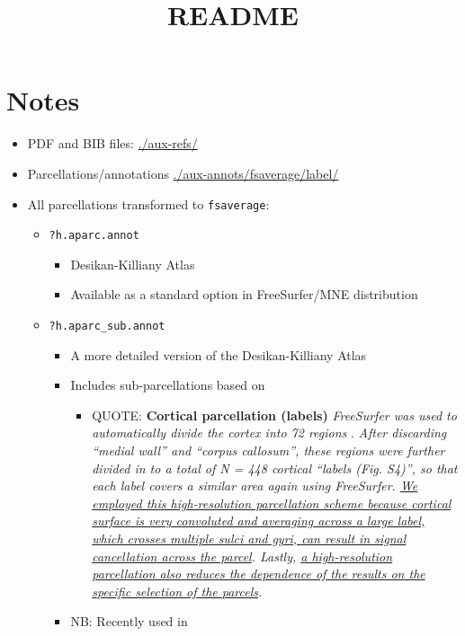 \documentclass[a4paper,10pt,onecolumn,oneside,openright]{article}
\date{}
\title{README}
\begin{document}
\maketitle
\section{Notes}
\label{sec:org0a92b78}
\begin{itemize}
\item PDF and BIB files: \url{./aux-refs/}
\item Parcellations/annotations \url{./aux-annots/fsaverage/label/}
\item All parcellations transformed to \texttt{fsaverage}:
\begin{itemize}
\item \texttt{?h.aparc.annot}
\begin{itemize}
\item Desikan-Killiany Atlas \parencite{r2006PaperDesikanEtAlN2}
\item Available as a standard option in FreeSurfer/MNE distribution
\end{itemize}
\item \texttt{?h.aparc\_sub.annot}
\begin{itemize}
\item A more detailed version of the Desikan-Killiany Atlas
\parencite{r2006PaperDesikanEtAlN2}
\item Includes sub-parcellations based on
\textcite{r2018PaperKhanEtAlN2}
\begin{itemize}
\item QUOTE: \textbf{Cortical parcellation (labels)} \emph{FreeSurfer was
used to automatically divide the cortex into 72 regions}
\parencite{r1999PaperDaleEtAlN2}. \emph{After discarding “medial
wall” and “corpus callosum”, these regions were further
divided in to a total of N = 448 cortical “labels (Fig.
S4)”, so that each label covers a similar area again using
FreeSurfer. \uline{We employed this high-resolution parcellation
scheme because cortical surface is very convoluted and
averaging across a large label, which crosses multiple
sulci and gyri, can result in signal cancellation across
the parcel}. Lastly, \uline{a high-resolution parcellation also
reduces the dependence of the results on the specific
selection of the parcels}.}
\end{itemize}
\item NB: Recently used in \textcite{r2025PaperRuuskanenAvendano-DiazN1}
\begin{itemize}

\end{itemize}
\end{itemize}
\end{itemize}
\end{itemize}
\end{document}

